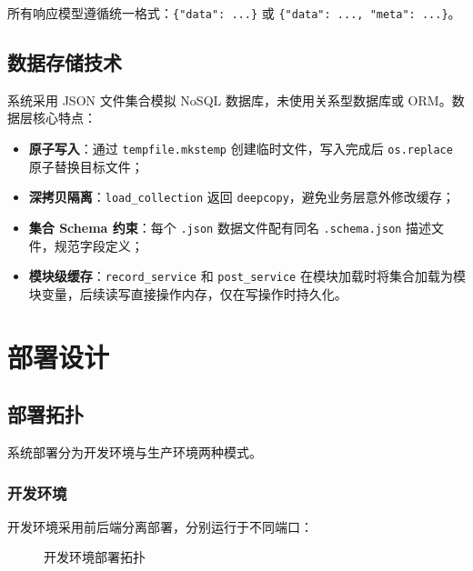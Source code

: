 \documentclass[12pt,a4paper]{ctexart}
\begin{document}
所有响应模型遵循统一格式：\texttt{\{"data": ...\}} 或 \texttt{\{"data": ..., "meta": ...\}}。

\subsection{数据存储技术}

系统采用 JSON 文件集合模拟 NoSQL 数据库，未使用关系型数据库或 ORM。数据层核心特点：

\begin{itemize}
  \item \textbf{原子写入}：通过 \texttt{tempfile.mkstemp} 创建临时文件，写入完成后 \texttt{os.replace} 原子替换目标文件；
  \item \textbf{深拷贝隔离}：\texttt{load\_collection} 返回 \texttt{deepcopy}，避免业务层意外修改缓存；
  \item \textbf{集合 Schema 约束}：每个 \texttt{.json} 数据文件配有同名 \texttt{.schema.json} 描述文件，规范字段定义；
  \item \textbf{模块级缓存}：\texttt{record\_service} 和 \texttt{post\_service} 在模块加载时将集合加载为模块变量，后续读写直接操作内存，仅在写操作时持久化。
\end{itemize}

\newpage

\section{部署设计}

\subsection{部署拓扑}

系统部署分为开发环境与生产环境两种模式。

\subsubsection{开发环境}

开发环境采用前后端分离部署，分别运行于不同端口：

\begin{figure}[H]
  \centering
  \caption{开发环境部署拓扑}
  \label{fig:deploy-topology}
\end{figure}
\end{document}
